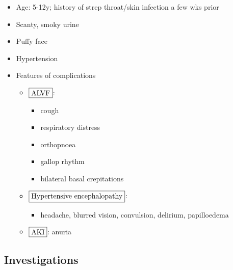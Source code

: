 \documentclass[
  12pt,
]{memoir}
\providecommand{\tightlist}{%
  \setlength{\itemsep}{0pt}\setlength{\parskip}{0pt}}
\begin{document}
\begin{itemize}
\tightlist
\item
  Age: 5-12y; history of strep throat/skin infection a few wks prior
\item
  Scanty, smoky urine
\item
  Puffy face
\item
  Hypertension
\item
  Features of complications

  \begin{itemize}
  \tightlist
  \item
    \(\fbox{ALVF}\):

    \begin{itemize}
    \tightlist
    \item
      cough
    \item
      respiratory distress
    \item
      orthopnoea
    \item
      gallop rhythm
    \item
      bilateral basal crepitations
    \end{itemize}
  \item
    \(\fbox{Hypertensive encephalopathy}\):

    \begin{itemize}
    \tightlist
    \item
      headache, blurred vision, convulsion, delirium, papilloedema
    \end{itemize}
  \item
    \(\fbox{AKI}\): anuria
  \end{itemize}
\end{itemize}

\hypertarget{investigations-2}{%
\subsection{Investigations}\label{investigations-2}}
\end{document}
